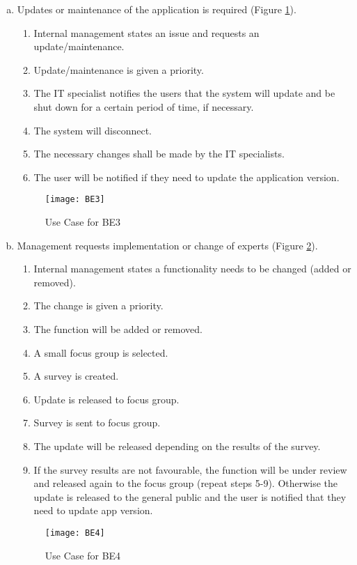\documentclass[titlepage]{article}
\begin{document}
\begin{enumerate}[a)]
	\item Updates or maintenance of the application is required (Figure \ref{usecase:updates}).
		\begin{enumerate}[{BE3}.1]
			\item Internal management states an issue and requests an update/maintenance.
			\item Update/maintenance is given a priority.
			\item The IT specialist notifies the users that the system will update and be shut down for a certain period of time, if necessary.
			\item The system will disconnect.
			\item The necessary changes shall be made by the IT specialists.
			\item The user will be notified if they need to update the application version.
		\end{enumerate}
	\begin{center}
		\begin{figure}[H]
			\texttt{[image: BE3]}
			\caption{Use Case for BE3}\label{usecase:updates}
		\end{figure}
	\end{center}
	
	\item Management requests implementation or change of experts (Figure \ref{usecase:change_expert}).
		\begin{enumerate}[{BE4}.1]
			\item Internal management states a functionality needs to be changed (added or removed).
			\item The change is given a priority.
			\item The function will be added or removed.
			\item A small focus group is selected.
			\item A survey is created.
			\item Update is released to focus group.
			\item Survey is sent to focus group.
			\item The update will be released depending on the results of the survey.
			\item If the survey results are not favourable, the function will be under review and released again to the focus group (repeat steps 5-9). Otherwise the update is released to the general public and the user is notified that they need to update app version.
		\end{enumerate}
	\begin{center}
		\begin{figure}[h!]
			\texttt{[image: BE4]}
			\caption{Use Case for BE4}\label{usecase:change_expert}
		\end{figure}
	\end{center}


\end{enumerate}
\end{document}
